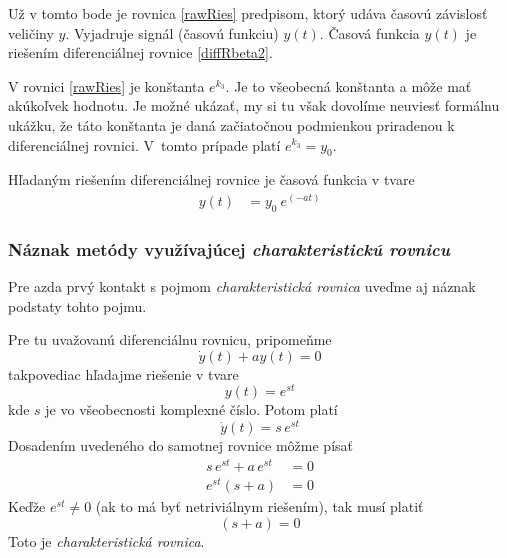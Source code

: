\documentclass[a4paper, 10pt, ]{article}
\begin{document}
Už v tomto bode je rovnica \eqref{rawRies} predpisom, ktorý udáva časovú závislosť veličiny $y$. Vyjadruje signál (časovú funkciu) $y(t)$. Časová funkcia $y(t)$ je riešením diferenciálnej rovnice \eqref{diffRbeta2}.

V rovnici \eqref{rawRies} je konštanta $e^{k_3}$. Je to všeobecná konštanta a môže mať akúkoľvek hodnotu. Je možné ukázať, my si tu však dovolíme neuviesť formálnu ukážku, že táto konštanta je daná začiatočnou podmienkou priradenou k diferenciálnej rovnici. V~tomto prípade platí $e^{k_3} = y_0$.

Hľadaným riešením diferenciálnej rovnice je časová funkcia v tvare
\begin{align}
    y(t)   &=  y_0 \ e^{\left( - a t \right)}   \label{rawRies2}
\end{align}




\subsubsection{Náznak metódy využívajúcej \emph{charakteristickú rovnicu}}

Pre azda prvý kontakt s pojmom \emph{charakteristická rovnica} uveďme aj náznak podstaty tohto pojmu.

Pre tu uvažovanú diferenciálnu rovnicu, pripomeňme
\begin{equation}
    \dot y(t) + a y(t) = 0
\end{equation}
takpovediac hľadajme riešenie v tvare
\begin{equation}
    y(t) = e^{st}
\end{equation}
kde $s$ je vo všeobecnosti komplexné číslo. Potom platí
\begin{equation}
    \dot y(t) = s\,e^{st}
\end{equation}
Dosadením uvedeného do samotnej rovnice môžme písať
\begin{align}
    s\,e^{st} + a\, e^{st} &= 0 \\
    e^{st} \left(s + a\right) &= 0 
\end{align}
Keďže $e^{st} \neq 0$ (ak to má byť netriviálnym riešením), tak musí platiť
\begin{equation}
    \left(s + a\right) = 0
\end{equation}
Toto je \emph{charakteristická rovnica}.
\end{document}
